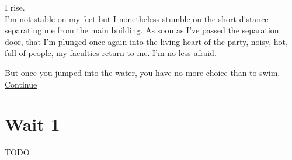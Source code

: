 \documentclass{report}
\newcommand{\glink}[2]{
	\hyperref[#1]{#2}
}
\newcommand{\gsection}[1]{
	\section*{#1}
	\label{#1}
}
\begin{document}
I rise.\\

I'm not stable on my feet but I nonetheless stumble on the short distance separating me from the main building. As soon as I've passed the separation door, that I'm plunged once again into the living heart of the party, noisy, hot, full of people, my faculties return to me. I'm no less afraid.

But once you jumped into the water, you have no more choice than to swim.\\

\glink{Searching for her}{Continue}\\

\gsection{Wait 1}

TODO


\begin{comment}
Most must be already quite drunk, especially the athletes who already enjoyed a \emph{generous} meal after their morning achievements.\\
 
I feel fire rising to my cheeks.

As per tradition, the morning was filled with numerous sportive events. Nothing as glorious as the Olympic games, but still a good deal of different competitions: jumping, wrestling, javelin throws, horse races... But I have little memories of all of them, completely eclipsed by the one which dried out my throat. The foot race.\\

More exactly, it's not the competition itself which left me unable to speak. I cannot even remember the name of the one who won it. But I do remember that she took part in it.

It's not that unusual for a woman to participate in such an event. Actually, there is often a token Spartan female athlete alongside the males, and they generally do quite well.

But that was not any woman. That was her.\\

These events are before everything else a present to the gods, and the competitors must be as resplendent as they are skilled, the sight of their nude bodies as much an offering as their actual performances.\\

And resplendent she was.\\

I helped her oiled herself before dawn, but there is a total difference between watching a greasy skin from close under the weak light of a candle and contemplating it shining under the bright sun.


\end{comment}
\end{document}
